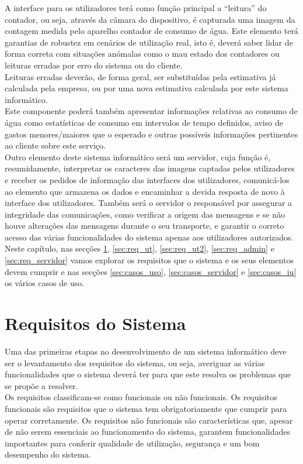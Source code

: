 A interface para os utilizadores terá como função principal a “leitura” do contador, ou seja, através da câmara do dispositivo, é capturada uma imagem da contagem medida pelo aparelho contador de consumo de água. Este elemento terá garantias de robustez em cenários de utilização real, isto é, deverá saber lidar de forma correta com situações anómalas como o mau estado dos contadores ou leituras erradas por erro do sistema ou do cliente.\\
Leituras erradas deverão, de forma geral, ser substituídas pela estimativa já calculada pela empresa, ou por uma nova estimativa calculada por este sistema informático.\\
Este componente poderá também apresentar informações relativas ao consumo de água como estatísticas de consumo em intervalos de tempo definidos, aviso de gastos menores/maiores que o esperado e outras possíveis informações pertinentes ao cliente sobre este serviço.\\
Outro elemento deste sistema informático será um servidor, cuja função é, resumidamente, interpretar os caracteres das imagens captadas pelos utilizadores e receber os pedidos de informação das interfaces dos utilizadores, comunicá-los ao elemento que armazena os dados e encaminhar a devida resposta de novo à interface dos utilizadores. Também será o servidor o responsável por assegurar a integridade das comunicações, como verificar a origem das mensagens e se não houve alterações das mensagens durante o seu transporte, e garantir o correto acesso das várias funcionalidades do sistema apenas aos utilizadores autorizados.\\

Neste capítulo, nas secções \ref{sec:req_sis}, \ref{sec:req_ut}, \ref{sec:req_ut2}, \ref{sec:req_admin} e \ref{sec:req_servidor} vamos explorar os requisitos que o sistema e os seus elementos devem cumprir e nas secções \ref{sec:casos_uso}, \ref{sec:casos_servidor} e \ref{sec:casos_iu} os vários casos de uso.

\section{Requisitos do Sistema} \label{sec:req_sis}
Uma das primeiras etapas no desenvolvimento de um sistema informático deve ser o levantamento dos requisitos do sistema, ou seja, averiguar as várias funcionalidades que o sistema deverá ter para que este resolva os problemas que se propõe a resolver.\\
Os requisitos classificam-se como funcionais ou não funcionais. Os requisitos funcionais são requisitos que o sistema tem obrigatoriamente que cumprir para operar corretamente. Os requisitos não funcionais são características que, apesar de não serem essenciais ao funcionamento do sistema, garantem funcionalidades importantes para conferir qualidade de utilização, segurança e um bom desempenho do sistema.


